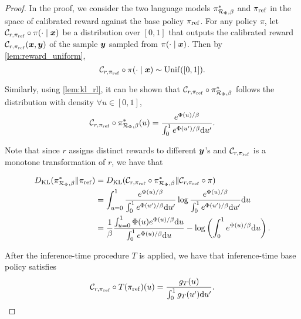\begin{proof}

In the proof, we consider the two language models $\pi^*_{\mathcal{R}_{\Phi}, \beta}$ and ${\pi_{\rm ref}}$ in the space of calibrated reward against the base policy ${\pi_{\rm ref}}$.  For any policy $\pi$, let $\mathcal{C}_{r, {\pi_{\rm ref}}} \circ \pi(\cdot \mid {\bm{x}})$ be a distribution over $[0, 1]$ that outputs the calibrated reward $\mathcal{C}_{r, {\pi_{\rm ref}}}({\bm{x}}, {\bm{y}})$ of the sample ${\bm{y}}$ sampled from $\pi(\cdot \mid {\bm{x}})$. Then by \cref{lem:reward_uniform},
\[
    \mathcal{C}_{r, {\pi_{\rm ref}}} \circ \pi(\cdot \mid {\bm{x}}) \sim {\rm Unif}([0, 1]) .
\]

Similarly, using \cref{lem:kl_rl}, it can be shown that $\mathcal{C}_{r, {\pi_{\rm ref}}} \circ \pi^*_{\mathcal{R}_{\Phi}, \beta}$ follows the distribution with density $\forall u \in [0, 1]$,
\[
    \mathcal{C}_{r, {\pi_{\rm ref}}} \circ \pi^*_{\mathcal{R}_{\Phi}, \beta} (u) = \frac{ e^{\Phi(u)/\beta} }{\int_{0}^1 e^{\Phi(u')/\beta} {\rm d} u'}.
\]

Note that since $r$ assigns distinct rewards to different ${\bm{y}}$'s and $\mathcal{C}_{r, {\pi_{\rm ref}}}$ is a monotone transformation of $r$, we
have that

\begin{align*}
   D_{\text{KL}}(\pi^*_{\mathcal{R}_{\Phi}, \beta} \| {\pi_{\rm ref}}) & =D_{\text{KL}}( \mathcal{C}_{r, {\pi_{\rm ref}}} \circ \pi^*_{\mathcal{R}_{\Phi}, \beta} \| \mathcal{C}_{r, {\pi_{\rm ref}}} \circ \pi ) \\
   & = \int_{u = 0}^1 \frac{ e^{\Phi(u)/\beta} }{\int_{0}^1 e^{\Phi(u')/\beta} {\rm d} u'} \log \frac{ e^{\Phi(u)/\beta} }{\int_{0}^1 e^{\Phi(u')/\beta} {\rm d} u'} {\rm d} u \\
   & = \frac{1}{\beta}  \frac{ \int_{u = 0}^1 \Phi(u) e^{\Phi(u)/\beta} {\rm d} u }{\int_{0}^1 e^{\Phi(u)/\beta} {\rm d} u} - \log \left(\int_{0}^1 e^{\Phi(u)/\beta} {\rm d} u\right).
\end{align*}

After the inference-time procedure $T$ is applied, we have that inference-time base policy satisfies
\[
    \mathcal{C}_{r, {\pi_{\rm ref}}} \circ T( {\pi_{\rm ref}}) (u) = \frac{ g_T( u )}{\int_{0}^1 g_T( u' ) {\rm d} u' }.
\]


\end{proof}
